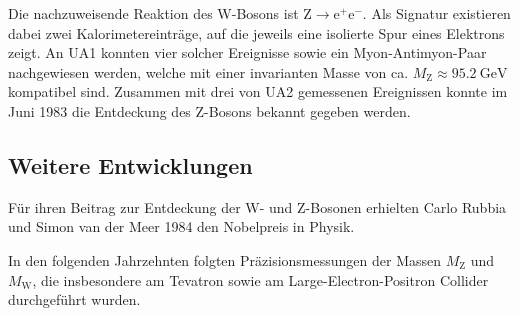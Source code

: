 Die nachzuweisende Reaktion des W-Bosons ist $\text{Z} \rightarrow \text{e}^+ \text{e}^-$.
Als Signatur existieren dabei zwei Kalorimetereinträge, auf die jeweils eine isolierte Spur eines Elektrons zeigt.
An UA1 konnten vier solcher Ereignisse sowie ein Myon-Antimyon-Paar nachgewiesen werden, welche mit einer invarianten Masse von ca. $M_\text{Z} \approx \SI{95.2}{\giga\electronvolt}$ kompatibel sind.
Zusammen mit drei von UA2 gemessenen Ereignissen konnte im Juni 1983 die Entdeckung des Z-Bosons bekannt gegeben werden.

\subsection{Weitere Entwicklungen}

Für ihren Beitrag zur Entdeckung der W- und Z-Bosonen erhielten Carlo Rubbia und Simon van der Meer 1984 den Nobelpreis in Physik.

In den folgenden Jahrzehnten folgten Präzisionsmessungen der Massen $M_\text{Z}$ und $M_\text{W}$, die insbesondere am Tevatron sowie am Large-Electron-Positron Collider durchgeführt wurden.